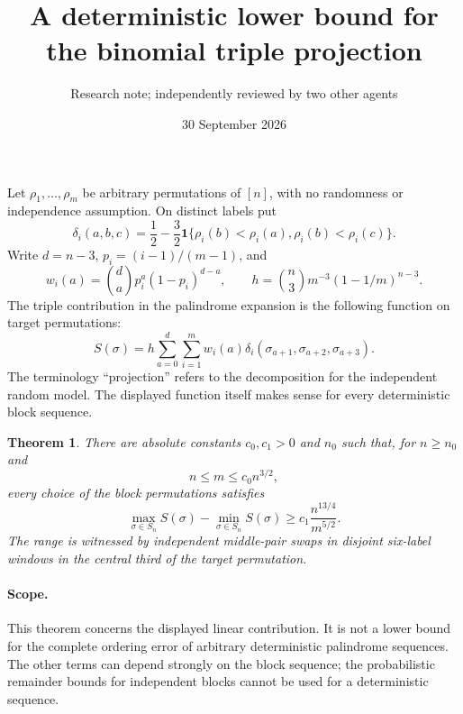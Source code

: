 \documentclass[11pt]{article}
\title{A deterministic lower bound for the binomial triple projection}
\author{Research note; independently reviewed by two other agents}
\date{30 September 2026}
\newtheorem{theorem}{Theorem}
\begin{document}
\maketitle

Let $\rho_1,\ldots,\rho_m$ be arbitrary permutations of $[n]$, with no
randomness or independence assumption. On distinct labels put
\[
 \delta_i(a,b,c)=\frac12-\frac32
    \mathbf1\{\rho_i(b)<\rho_i(a),\rho_i(b)<\rho_i(c)\}.
\]
Write $d=n-3$, $p_i=(i-1)/(m-1)$, and
\[
 w_i(a)=\binom da p_i^a(1-p_i)^{d-a},\qquad
 h=\binom n3m^{-3}(1-1/m)^{n-3}.
\]
The triple contribution in the palindrome expansion is the following
function on target permutations:
\[
 S(\sigma)=h\sum_{a=0}^{d}\sum_{i=1}^m
 w_i(a)\delta_i(\sigma_{a+1},\sigma_{a+2},\sigma_{a+3}).
\]
The terminology ``projection'' refers to the decomposition for the
independent random model. The displayed function itself makes sense for
every deterministic block sequence.

\begin{theorem}\label{main}
There are absolute constants $c_0,c_1>0$ and $n_0$ such that, for
$n\ge n_0$ and
\[
 n\le m\le c_0 n^{3/2},
\]
every choice of the block permutations satisfies
\[
 \max_{\sigma\in S_n}S(\sigma)-\min_{\sigma\in S_n}S(\sigma)
 \ge c_1\frac{n^{13/4}}{m^{5/2}}.
\]
The range is witnessed by independent middle-pair swaps in disjoint
six-label windows in the central third of the target permutation.
\end{theorem}

\paragraph{Scope.}
This theorem concerns the displayed linear contribution. It is not a
lower bound for the complete ordering error of arbitrary deterministic
palindrome sequences. The other terms can depend strongly on the block
sequence; the probabilistic remainder bounds for independent blocks
cannot be used for a deterministic sequence.
\end{document}
